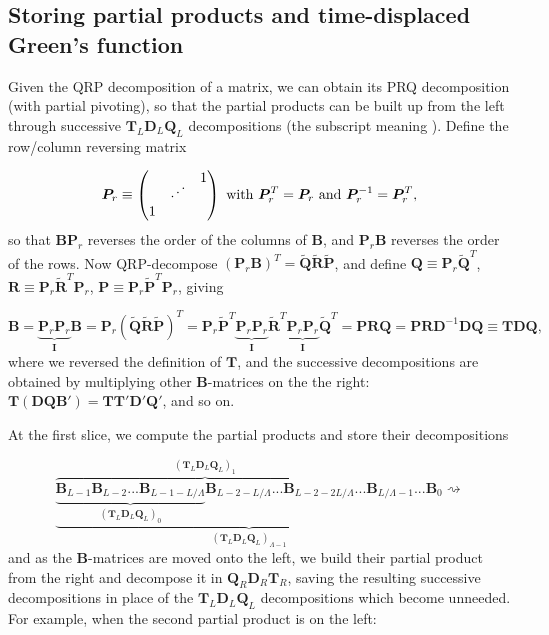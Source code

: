 \subsection{Storing partial products and time-displaced Green's function}
\label{subsec:partial}

Given the QRP decomposition of a matrix, we can obtain its PRQ decomposition (with partial pivoting), so that the partial products can be built up from the left through successive $\bm T_L \bm D_L \bm Q_L$ decompositions (the subscript meaning ).
Define the row/column reversing matrix 

\begin{equation}
\bm P_r \equiv
\begin{pmatrix}
 & & 1 \\
 & \rddots & \\
1& & 
\end{pmatrix}
\,\, \text{with} \,\, \bm P_r^T = \bm P_r \,\, \text{and} \,\, \bm P_r^{-1} = \bm P_r^T ,
\end{equation}
so that $\bm B \bm P_r$ reverses the order of the columns of $\bm B$, and $\bm P_r \bm B$ reverses the order of the rows.
Now QRP-decompose $(\bm P_r \bm B)^T = \tilde{\bm Q} \tilde{\bm R} \tilde{\bm P}$, and define $\bm Q \equiv \bm P_r \tilde{\bm Q}^T$, $\bm R \equiv \bm P_r \tilde{\bm R}^T \bm P_r$, $\bm P \equiv \bm P_r \tilde{\bm P}^T \bm P_r$, giving

\begin{equation}
\bm B = \underbrace{\bm P_r \bm P_r}_{\bm I} \bm B = \bm P_r ( \tilde{\bm Q} \tilde{\bm R} \tilde{\bm P} )^T =  \bm P_r \tilde{\bm P}^T \underbrace{\bm P_r \bm P_r}_{\bm I} \tilde{\bm R}^T \underbrace{\bm P_r \bm P_r}_{\bm I} \tilde{\bm Q}^T = \bm P \bm R \bm Q = \bm P \bm R \bm D^{-1} \bm D \bm Q \equiv \bm T \bm D \bm Q ,
\end{equation}
where we reversed the definition of $\bm T$, and the successive decompositions are obtained by multiplying other $\bm B$-matrices on the the right: $\bm T (\bm D \bm Q \bm B') = \bm T \bm T' \bm D' \bm Q'$, and so on.

At the first slice, we compute the partial products and store their decompositions

\begin{equation}
\underbrace{ \overbrace{ \underbrace{\bm B_{L - 1} \bm B_{L-2} ... \bm B_{L - 1- L / \Lambda}}_{(\bm T_L \bm D_L \bm Q_L)_{0} }  \bm B_{L - 2 - L / \Lambda} ...\bm B_{L - 2 - 2 L / \Lambda} }^{(\bm T_L \bm D_L \bm Q_L)_{1}} ... \bm B_{L / \Lambda - 1} ...  \bm B_0}_{(\bm T_L \bm D_L \bm Q_L)_{\Lambda - 1}} \rightsquigarrow 
\end{equation}
and as the $\bm B$-matrices are moved onto the left, we build their partial product from the right and decompose it in $\bm Q_R \bm D_R \bm T_R$, saving the resulting successive decompositions in place of the $\bm T_L \bm D_L \bm Q_L$ decompositions which become unneeded.
For example, when the second partial product is on the left:

